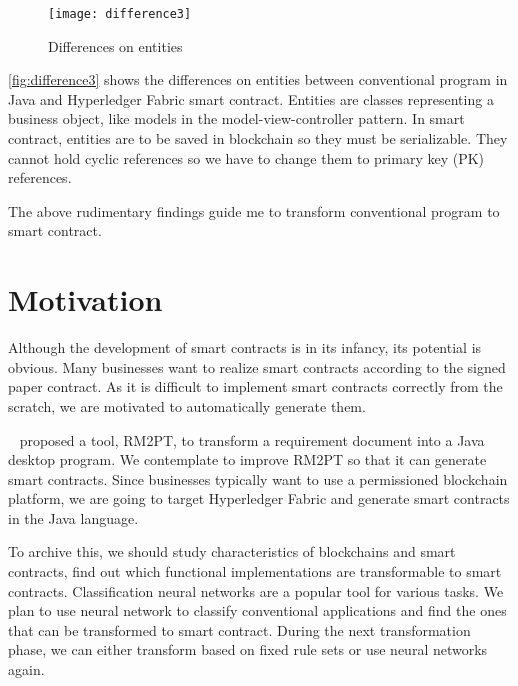 \begin{figure}[ht]
\centering
\texttt{[image: difference3]}
\caption{Differences on entities}
\label{fig:difference3}
\end{figure}


\autoref{fig:difference3} shows the differences on entities between conventional program in Java and Hyperledger Fabric smart contract.
Entities are classes representing a business object, like models in the model-view-controller pattern.
In smart contract, entities are to be saved in blockchain so they must be serializable. They cannot hold cyclic references so we have to change them to primary key (PK) references.

The above rudimentary findings guide me to transform conventional program to smart contract.

\section{Motivation}


Although the development of smart contracts is in its infancy, its potential is obvious. Many businesses want to realize smart contracts according to the signed paper contract.
As it is difficult to implement smart contracts correctly from the scratch,
we are motivated to automatically generate them.

~\cite{yang2019automated} proposed a tool, RM2PT, to transform a requirement document into a Java desktop program.
We contemplate to improve RM2PT so that it can generate smart contracts.
Since businesses typically want to use a permissioned blockchain platform, we are going to target Hyperledger Fabric and generate smart contracts in the Java language.

To archive this, we should study characteristics of blockchains and smart contracts, find out which functional implementations are transformable to smart contracts.
Classification neural networks are a popular tool for various tasks.
We plan to use neural network to classify conventional applications and find the ones that can be transformed to smart contract.
During the next transformation phase, we can either transform based on fixed rule sets or use neural networks again.



